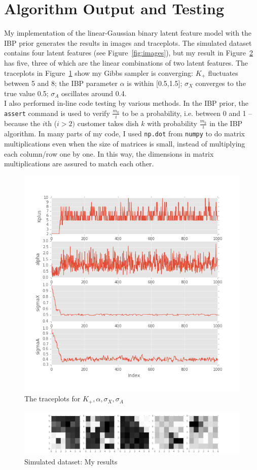 \section{Algorithm Output and Testing}
My implementation of the linear-Gaussian binary latent feature model with the IBP prior generates the results in images and traceplots. The simulated dataset contains four latent features (see Figure~\ref{fig:images}), but my result in Figure~\ref{fig:imageresults} has five, three of which are the linear combinations of two latent features. The traceplots in Figure~\ref{fig:plotresults} show my Gibbs sampler is converging: $K_+$ fluctuates between 5 and 8; the IBP parameter $\alpha$ is within [0.5,1.5]; $\sigma_X$ converges to the true value 0.5; $\sigma_A$ oscillates around 0.4.\\

I also performed in-line code testing by various methods. In the IBP prior, the \texttt{assert} command is used to verify $\frac{m_k}{i}$ to be a probability, i.e. between 0 and 1 -- because the $i$th ($i > 2)$ customer takes dish $k$ with probability $\frac{m_k}{i}$ in the IBP algorithm. In many parts of my code, I used \texttt{np.dot} from \texttt{numpy} to do matrix multiplications even when the size of matrices is small, instead of multiplying each column/row one by one. In this way, the dimensions in matrix multiplications are assured to match each other.

\begin{figure}[!ht]
\centering
    \includegraphics[width=0.65\linewidth]{IBP_plot_results.png}
    \vspace{-20pt}
    \caption{The traceplots for $K_+, \alpha, \sigma_X, \sigma_A$}
    \label{fig:plotresults}
\end{figure}

\begin{figure}[!ht]
\centering
    \includegraphics[width=\linewidth]{IBP_image_results.png}
    \caption{Simulated dataset: My results}
    \label{fig:imageresults}
\end{figure}